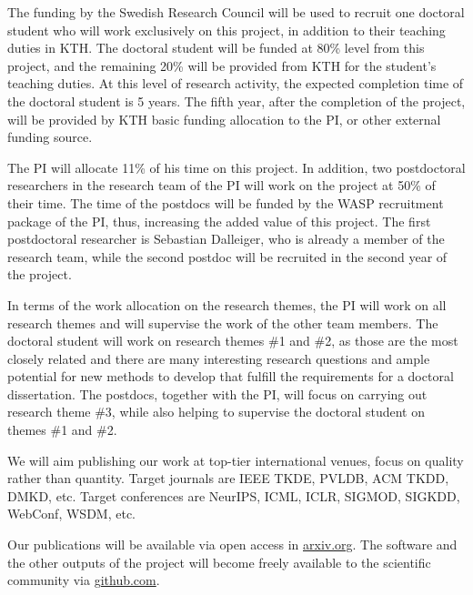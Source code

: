 \documentclass[a4paper,11pt]{article}
\begin{document}
The funding by the Swedish Research Council will be used to recruit 
one doctoral student who will work exclusively on this project, 
in addition to their teaching duties in KTH.
The doctoral student will be funded at 80\% level from this project, 
and the remaining 20\% will be provided from KTH for the student's teaching duties. 
At this level of research activity, the expected completion time of the doctoral student is 5 years. 
The fifth year, after the completion of the project, 
will be provided by KTH basic funding allocation to the PI, or other external funding source. 

The PI will allocate 11\% of his time on this project.
In addition, two postdoctoral researchers in the research team of the PI
will work on the project at 50\% of their time. 
The time of the postdocs will be funded by the WASP recruitment package of the PI, 
thus, increasing the added value of this project.
The first postdoctoral researcher is Sebastian Dalleiger, 
who is already a member of the research team, 
while the second postdoc will be recruited in the second year of the project.

In terms of the work allocation on the research themes, 
the PI will work on all research themes and will supervise the work of the other team members. 
The doctoral student will work on research themes \#1 and \#2, 
as those are the most closely related and there are many interesting research questions
and ample potential for new methods to develop that fulfill the requirements for a doctoral dissertation. 
The postdocs, together with the PI, will focus on carrying out research theme \#3,
while also helping to supervise the doctoral student on themes \#1 and \#2.

We will aim publishing our work at top-tier international venues, 
focus on quality rather than quantity.
% 
Target journals 
are IEEE TKDE, PVLDB, ACM TKDD,  DMKD, etc. 
Target conferences are NeurIPS, ICML, ICLR, SIGMOD, SIGKDD, WebConf, WSDM, etc.

Our publications will be available via open access in {\small\url{arxiv.org}}. 
The software and the other outputs of the project 
will become freely available to the scientific community via {\small\url{github.com}}. %
\end{document}
